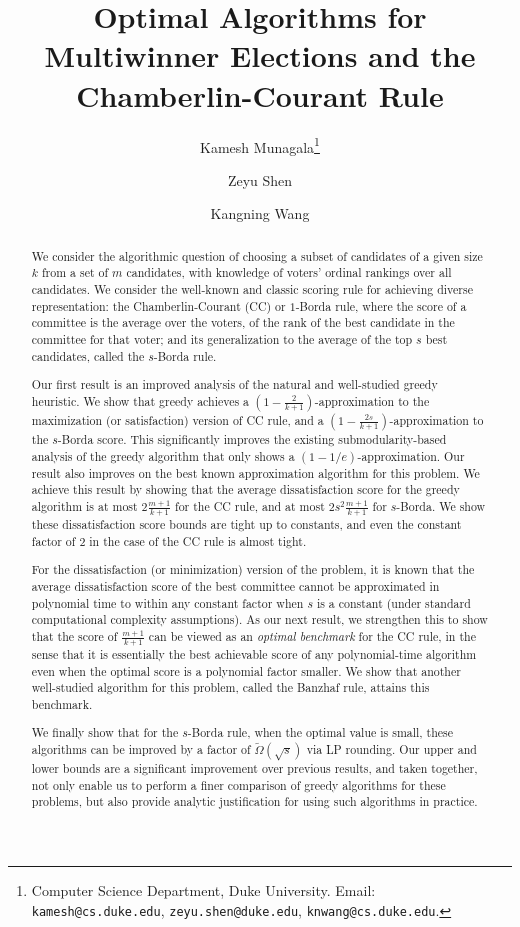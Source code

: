 \documentclass{article}
\title{Optimal Algorithms for Multiwinner Elections and the Chamberlin-Courant Rule}
\author{Kamesh Munagala\thanks{Computer Science Department, Duke University. Email: \texttt{kamesh@cs.duke.edu}, \texttt{zeyu.shen@duke.edu}, \texttt{knwang@cs.duke.edu}.} \and Zeyu Shen\samethanks[1] \and Kangning Wang\samethanks[1]}
\date{}
\begin{document}
\maketitle

\begin{abstract}
We consider the algorithmic question of choosing a subset of candidates of a given size $k$ from a set of $m$ candidates, with knowledge of voters' ordinal rankings over all candidates. We consider the well-known and classic scoring rule for achieving diverse representation: the Chamberlin-Courant (CC) or $1$-Borda rule, where the score of a committee is the average over the voters, of the rank of the best candidate in the committee for that voter; and its generalization to the average of the top $s$ best candidates, called the $s$-Borda rule. 

Our first result is an improved analysis of the natural and well-studied greedy heuristic. We show that greedy achieves a $\left(1 - \frac{2}{k+1}\right)$-approximation to the maximization (or satisfaction) version of CC rule, and a $\left(1 - \frac{2s}{k+1}\right)$-approximation to the $s$-Borda score. This significantly improves the existing submodularity-based analysis of the greedy algorithm that only shows a $(1-1/e)$-approximation. Our result also improves on the best known approximation algorithm for this problem. We achieve this result by showing that the average dissatisfaction score for the greedy algorithm is at most $2\frac{m+1}{k+1}$ for the CC rule, and at most $2s^2 \frac{m+1}{k+1}$ for $s$-Borda. We show these dissatisfaction score bounds are tight up to constants, and even the constant factor of $2$ in the case of the CC rule is almost tight.

For the dissatisfaction (or minimization) version of the problem, it is known that the average dissatisfaction score of the best committee cannot be approximated in polynomial time to within any constant factor when $s$ is a constant (under standard computational complexity assumptions). As our next result, we strengthen this to show that the score of $\frac{m+1}{k+1}$ can be viewed as an \emph{optimal benchmark} for the CC rule, in the sense that it is essentially the best achievable score of any polynomial-time algorithm even when the optimal score is a polynomial factor smaller. We show that another well-studied algorithm for this problem, called the Banzhaf rule, attains this benchmark. 

We finally show that for the $s$-Borda rule, when the optimal value is small, these algorithms can be improved by a factor of $\tilde \Omega(\sqrt{s})$ via LP rounding. Our upper and lower bounds are a significant improvement over previous results, and taken together, not only enable us to perform a finer comparison of greedy algorithms for these problems, but also provide analytic justification for using such algorithms in practice.
\end{abstract}
\end{document}
